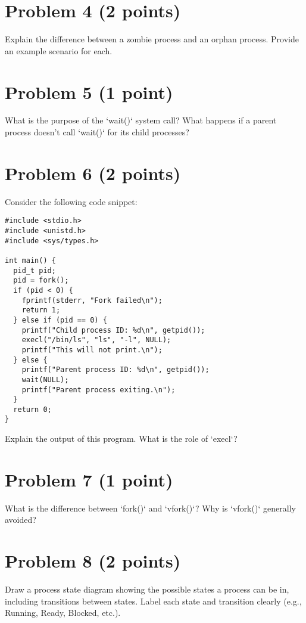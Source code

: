 \documentclass{article}
\begin{document}
\section*{Problem 4 (2 points)}

Explain the difference between a zombie process and an orphan process. Provide an example scenario for each.


\section*{Problem 5 (1 point)}

What is the purpose of the `wait()` system call? What happens if a parent process doesn't call `wait()` for its child processes?


\section*{Problem 6 (2 points)}

Consider the following code snippet:

\begin{verbatim}
#include <stdio.h>
#include <unistd.h>
#include <sys/types.h>

int main() {
  pid_t pid;
  pid = fork();
  if (pid < 0) {
    fprintf(stderr, "Fork failed\n");
    return 1;
  } else if (pid == 0) {
    printf("Child process ID: %d\n", getpid());
    execl("/bin/ls", "ls", "-l", NULL); 
    printf("This will not print.\n"); 
  } else {
    printf("Parent process ID: %d\n", getpid());
    wait(NULL);
    printf("Parent process exiting.\n");
  }
  return 0;
}
\end{verbatim}

Explain the output of this program.  What is the role of `execl`?


\section*{Problem 7 (1 point)}

What is the difference between `fork()` and `vfork()`?  Why is `vfork()` generally avoided?


\section*{Problem 8 (2 points)}

Draw a process state diagram showing the possible states a process can be in, including transitions between states.  Label each state and transition clearly (e.g., Running, Ready, Blocked, etc.).
\end{document}
